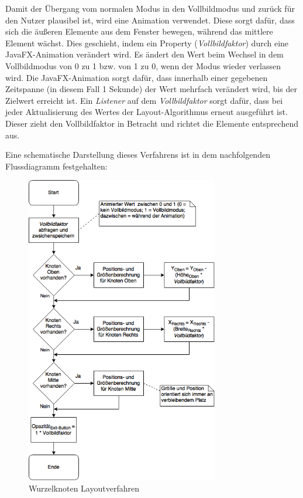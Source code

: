 Damit der Übergang vom normalen Modus in den Vollbildmodus und zurück für den Nutzer plausibel ist, wird eine Animation verwendet. Diese sorgt dafür, dass sich die äußeren Elemente aus dem Fenster bewegen, während das mittlere Element wächst. Dies geschieht, indem ein Property (\textit{Vollbildfaktor}) durch eine JavaFX-Animation verändert wird. Es ändert den Wert beim Wechsel in dem Vollbildmodus von 0 zu 1 bzw. von 1 zu 0, wenn der Modus wieder verlassen wird. Die JavaFX-Animation sorgt dafür, dass innerhalb einer gegebenen Zeitspanne (in diesem Fall 1 Sekunde) der Wert mehrfach verändert wird, bis der Zielwert erreicht ist. Ein \textit{Listener} auf dem \textit{Vollbildfaktor} sorgt dafür, dass bei jeder Aktualisierung des Wertes der Layout-Algorithmus erneut ausgeführt ist. Dieser zieht den Vollbildfaktor in Betracht und richtet die Elemente entsprechend aus.\par
Eine schematische Darstellung dieses Verfahrens ist in dem nachfolgenden Flussdiagramm festgehalten:
\begin{figure}[H]
 \centering
 \includegraphics[width=0.75\textwidth]{grafiken/root_node_layout.png}
 \caption{Wurzelknoten Layoutverfahren}
 \label{fig:rootNodeLayout}
\end{figure}

